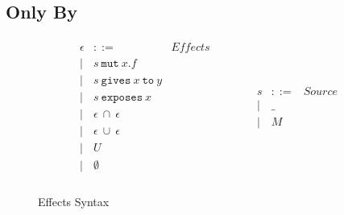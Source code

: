 \documentclass[12pt]{article}
\newcommand\mut[3]{#1\ \texttt{mut}\ #2.#3}
\newcommand\gives[3]{#1\ \texttt{gives}\ #2\ \texttt{to}\ #3}
\newcommand\exposes[2]{#1\ \texttt{exposes}\ #2}
\newcommand\univ{U}
\begin{document}
\subsection{Only By}
\begin{figure}[t]
\footnotesize
\[
\begin{array}{lcr}
\begin{array}{llr}
	\epsilon & ::= &\textit{Effects}\\ 
	| & \mut{s}{x}{f} & \\
	| & \gives{s}{x}{y} & \\
	| & \exposes{s}{x} & \\
	| & \epsilon\ \cap\ \epsilon & \\
	| & \epsilon\ \cup\ \epsilon & \\
	| & \univ & \\
	| & \emptyset & \\
\end{array} &
~~~~~~~~&
\begin{array}{llr}
s & ::= &\textit{Source}\\ 
	| & \_ & \\
	| & M & \\
\end{array}
\end{array}
\]
\normalsize
\caption{Effects Syntax}
\label{f:effect_syntax_triple}
\end{figure}
\end{document}
